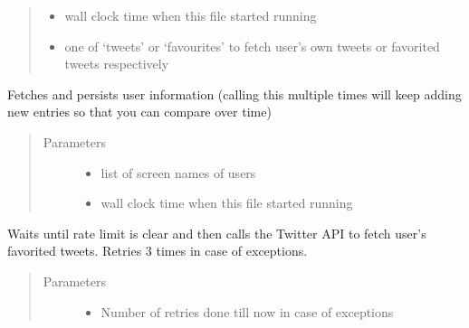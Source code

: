 \documentclass[letterpaper,10pt,english]{sphinxmanual}
\begin{document}
\begin{fulllineitems}
\begin{fulllineitems}
\begin{quote}
\begin{description}
\begin{itemize}
\item {} 
 \textendash{} wall clock time when this file started running

\item {} 
 \textendash{} one of ‘tweets’ or ‘favourites’ to fetch user’s own tweets or favorited tweets respectively

\end{itemize}

\end{description}\end{quote}

\end{fulllineitems}


\begin{fulllineitems}
\label{\detokenize{twitter_stream:userstimeline.UserTimelineAPI.fetch_persist_users}}
Fetches and persists user information (calling this multiple times will keep adding new entries so that you can compare over time)
\begin{quote}\begin{description}
\item[{Parameters}] \leavevmode\begin{itemize}
\item {} 
 \textendash{} list of screen names of users

\item {} 
 \textendash{} wall clock time when this file started running

\end{itemize}

\end{description}\end{quote}

\end{fulllineitems}


\begin{fulllineitems}
\label{\detokenize{twitter_stream:userstimeline.UserTimelineAPI.my_favourites_fetcher}}
Waits until rate limit is clear and then calls the Twitter API to fetch user’s favorited tweets.
Retries 3 times in case of exceptions.
\begin{quote}\begin{description}
\item[{Parameters}] \leavevmode\begin{itemize}
\item {} 
 \textendash{} Number of retries done till now in case of exceptions


\end{itemize}
\end{description}
\end{quote}
\end{fulllineitems}
\end{fulllineitems}
\end{document}
